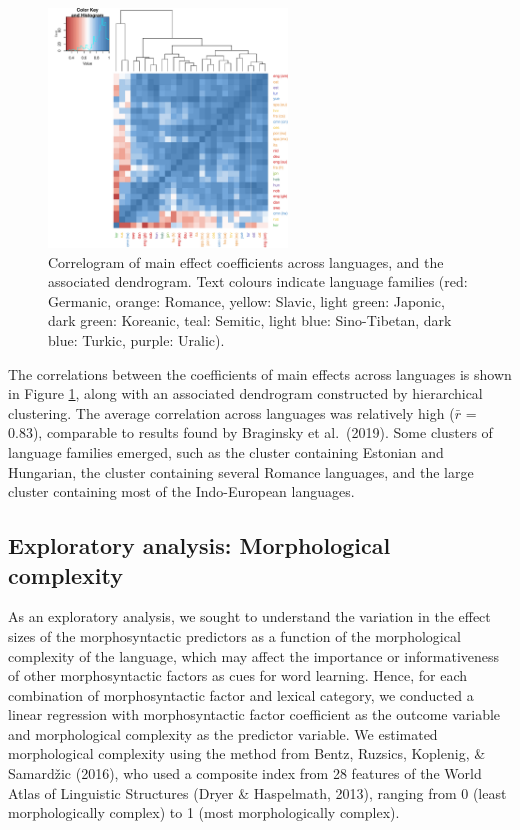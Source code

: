 \documentclass[10pt, letterpaper]{article}
\newenvironment{CodeChunk}{}{}
\begin{document}
\begin{CodeChunk}
\begin{figure}[ht]

{\centering \includegraphics[width=240px]{figs/correlogram-1} 

}

\caption[Correlogram of main effect coefficients across languages, and the associated dendrogram]{Correlogram of main effect coefficients across languages, and the associated dendrogram. Text colours indicate language families (red: Germanic, orange: Romance, yellow: Slavic, light green: Japonic, dark green: Koreanic, teal: Semitic, light blue: Sino-Tibetan, dark blue: Turkic, purple: Uralic). }\label{fig:correlogram}
\end{figure}
\end{CodeChunk}

The correlations between the coefficients of main effects across
languages is shown in Figure \ref{fig:correlogram}, along with an
associated dendrogram constructed by hierarchical clustering. The
average correlation across languages was relatively high (\(\bar{r}\) =
0.83), comparable to results found by Braginsky et al.~(2019). Some
clusters of language families emerged, such as the cluster containing
Estonian and Hungarian, the cluster containing several Romance
languages, and the large cluster containing most of the Indo-European
languages.

\hypertarget{exploratory-analysis-morphological-complexity}{%
\subsection{Exploratory analysis: Morphological
complexity}\label{exploratory-analysis-morphological-complexity}}

As an exploratory analysis, we sought to understand the variation in the
effect sizes of the morphosyntactic predictors as a function of the
morphological complexity of the language, which may affect the
importance or informativeness of other morphosyntactic factors as cues
for word learning. Hence, for each combination of morphosyntactic factor
and lexical category, we conducted a linear regression with
morphosyntactic factor coefficient as the outcome variable and
morphological complexity as the predictor variable. We estimated
morphological complexity using the method from Bentz, Ruzsics, Koplenig,
\& Samardžic (2016), who used a composite index from 28 features of the
World Atlas of Linguistic Structures (Dryer \& Haspelmath, 2013),
ranging from 0 (least morphologically complex) to 1 (most
morphologically complex).
\end{document}
